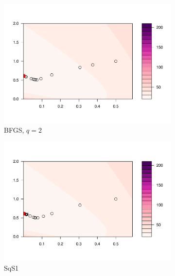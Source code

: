\documentclass[12pt]{article}
\begin{document}
\begin{figure}
\begin{subfigure}[h]{0.45\textwidth}
        \includegraphics[width = \textwidth]{plots/beta-contour_BFGS2.pdf}
        \caption{BFGS, $q=2$}
        \label{}
    \end{subfigure}
    \begin{subfigure}[h]{0.45\textwidth}
        \centering
        \includegraphics[width = \textwidth]{plots/beta-contour_SqS1.pdf}
        \caption{SqS1}
        \label{}
    \end{subfigure}\\
    \begin{subfigure}[h]{0.45\textwidth}
        \centering

\end{subfigure}
\end{figure}
\end{document}
